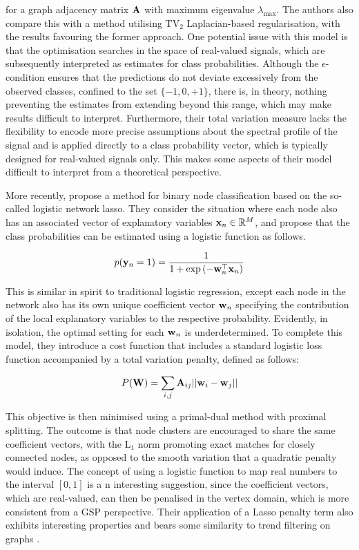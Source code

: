for a graph adjacency matrix $\mathbf{A}$ with maximum eigenvalue $\lambda_{\text{max}}$. The authors also compare this with a method utilising $\text{TV}_2$ Laplacian-based regularisation, with the results favouring the former approach. One potential issue with this model is that the optimisation searches in the space of real-valued signals, which are subsequently interpreted as estimates for class probabilities. Although the $\epsilon$-condition ensures that the predictions do not deviate excessively from the observed classes, confined to the set $\{-1, 0, +1\}$, there is, in theory, nothing preventing the estimates from extending beyond this range, which may make results difficult to interpret. Furthermore, their total variation measure lacks the flexibility to encode more precise assumptions about the spectral profile of the signal and is applied directly to a class probability vector, which is typically designed for real-valued signals only. This makes some aspects of their model difficult to interpret from a theoretical perspective. 

More recently, \cite{Tran2020} propose a method for binary node classification based on the so-called logistic network lasso. They consider the situation where each node also has an associated vector of explanatory variables $\mathbf{x}_n \in \mathbb{R}^M$, and propose that the class probabilities can be estimated using a logistic function as follows. 

\begin{equation}
    p(\mathbf{y}_n = 1) = \frac{1}{1 + \exp \left(-\mathbf{w}_n^\top \mathbf{x}_n \right)}
\end{equation}

This is similar in spirit to traditional logistic regression, except each node in the network also has its own unique coefficient vector $\mathbf{w}_n$ specifying the contribution of the local explanatory variables to the respective probability. Evidently, in isolation, the optimal setting for each $\mathbf{w}_n$ is underdetermined. To complete this model, they introduce a cost function that includes a standard logistic loss function accompanied by a total variation penalty, defined as follows:

\begin{equation}
    P(\mathbf{W}) = \sum_{i, j} \mathbf{A}_{ij} || \mathbf{w}_i - \mathbf{w}_j ||
\end{equation}

This objective is then minimised using a primal-dual method with proximal splitting. The outcome is that node clusters are encouraged to share the same coefficient vectors, with the L$_1$ norm promoting exact matches for closely connected nodes, as opposed to the smooth variation that a quadratic penalty would induce. The concept of using a logistic function to map real numbers to the interval $[0, 1]$ is a n interesting suggestion, since the coefficient vectors, which are real-valued, can then be penalised in the vertex domain, which is more consistent from a GSP perspective. Their application of a Lasso penalty term also exhibits interesting properties and bears some similarity to trend filtering on graphs \citep{Wang2016}.

